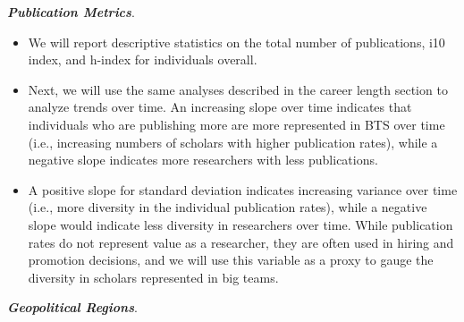 \documentclass[
  man]{apa7}
\providecommand{\tightlist}{%
  \setlength{\itemsep}{0pt}\setlength{\parskip}{0pt}}
\begin{document}
\textbf{\emph{Publication Metrics}}.

\begin{itemize}
\tightlist
\item
  We will report descriptive statistics on the total number of
  publications, i10 index, and h-index for individuals overall.
\item
  Next, we will use the same analyses described in the career length
  section to analyze trends over time. An increasing slope over time
  indicates that individuals who are publishing more are more
  represented in BTS over time (i.e., increasing numbers of scholars
  with higher publication rates), while a negative slope indicates
  more researchers with less publications.
\item
  A positive slope for standard deviation indicates increasing
  variance over time (i.e., more diversity in the individual
  publication rates), while a negative slope would indicate less
  diversity in researchers over time. While publication rates do not
  represent value as a researcher, they are often used in hiring and
  promotion decisions, and we will use this variable as a proxy to
  gauge the diversity in scholars represented in big teams.
\end{itemize}

\textbf{\emph{Geopolitical Regions}}.
\end{document}
